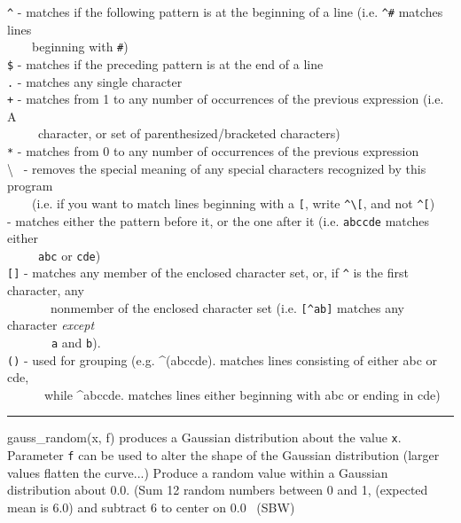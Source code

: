 \texttt{\^{}} - matches if the following pattern is at the beginning of
a line (i.e. \texttt{\^{}\#} matches lines \ \\
 \ \ \ \ beginning with
\texttt{{\textquotedbl}\#{\textquotedbl}})\\
\texttt{\$} - matches if the preceding pattern is at the end of a
line\\
\texttt{.} - matches any single character\\
\texttt{+} - matches from 1 to any number of occurrences of the previous
expression (i.e. A\\
 \ \ \ \ \ character, or set of parenthesized/bracketed
characters)\\
\texttt{*} - matches from 0 to any number of occurrences of the previous
expression\\
{\textbackslash} \ {}- removes the special meaning of any special
characters recognized by this program\\
 \ \ \ \ (i.e. if you want to match lines beginning with a
\texttt{{\textquotedbl}[{\textquotedbl}}, write
\texttt{\^{}{\textbackslash}[}, and not \texttt{\^{}[})\\
\texttt{{\textbar}} - matches either the pattern before it, or the one
after it (i.e. \texttt{abc{\textbar}cde} matches either\\
 \ \ \ \ \ \texttt{abc} or \texttt{cde})\\
\texttt{[]} - matches any member of the enclosed character set, or, if
\texttt{\^{}} is the first character, any\\
 \ \ \ \ \ \ \ nonmember of the enclosed character set (i.e.
\texttt{[\^{}ab]} matches any character \textit{except\\
 \ \ \ \ \ \ }\ \texttt{a} and \texttt{b}).\\
\texttt{()} - used for grouping (e.g. \^{}(abc{\textbar}cde). matches
lines consisting of either \textsf{{\textquotedbl}abc{\textquotedbl}}
or \textsf{{\textquotedbl}cde{\textquotedbl},}\\
 \ \ \ \ \ \ while \textsf{\^{}abc{\textbar}cde}. matches lines either
beginning with \textsf{{\textquotedbl}abc{\textquotedbl}} or ending in
\textsf{{\textquotedbl}cde{\textquotedbl}})

\vspace{0.25cm}\hrule{}

\textsf{gauss\_random(x, f)} produces a Gaussian distribution about the value \texttt{x}.
Parameter \texttt{f} can be used to alter the shape of the Gaussian
distribution (larger values flatten the curve...) Produce a random
value within a Gaussian distribution about 0.0. (Sum 12 random numbers
between 0 and 1, (expected mean is 6.0) and subtract 6 to center on 0.0
\ (SBW)

